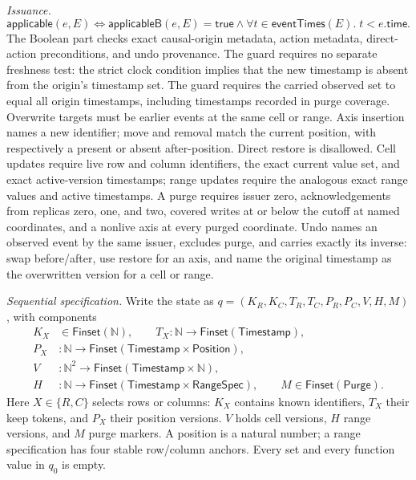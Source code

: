 \documentclass[11pt]{article}
\theoremstyle{definition}
\newcommand{\N}{\mathbb N}
\newcommand{\Time}{\mathsf{Timestamp}}
\begin{document}
\emph{Issuance.}
\[
 \mathsf{applicable}(e,E)\Longleftrightarrow
 \mathsf{applicableB}(e,E)=\mathsf{true}
 \land\forall t\in\mathsf{eventTimes}(E).\;t<e.\mathsf{time}.
\]
The Boolean part checks exact causal-origin metadata, action
metadata, direct-action preconditions, and undo provenance. The guard requires
no separate freshness test: the strict clock condition implies that the new
timestamp is absent from the origin's timestamp set. The guard requires
the carried observed set to equal all origin timestamps, including timestamps
recorded in purge coverage. Overwrite targets must be earlier events at the
same cell or range. Axis insertion names a new identifier; move and removal
match the current position, with respectively a present or absent after-position.
Direct restore is disallowed. Cell updates require live row and column
identifiers, the exact current value set, and exact active-version timestamps;
range updates require the analogous exact range values and active timestamps.
A purge requires issuer zero, acknowledgements from replicas zero, one, and
two, covered writes at or below the cutoff at named coordinates, and a nonlive
axis at every purged coordinate. Undo names an observed event by the same
issuer, excludes purge, and carries exactly its inverse: swap before/after,
use restore for an axis, and name the original timestamp as the overwritten
version for a cell or range.

\emph{Sequential specification.} Write the state as
$q=(K_R,K_C,T_R,T_C,P_R,P_C,V,H,M)$, with components
\[
\begin{aligned}
 K_X&\in\mathsf{Finset}(\N),\qquad
 T_X:\N\to\mathsf{Finset}(\Time),\\
 P_X&:\N\to\mathsf{Finset}(\Time\times\mathsf{Position}),\\
 V&:\N^2\to\mathsf{Finset}(\Time\times\N),\\
 H&:\N\to\mathsf{Finset}(\Time\times\mathsf{RangeSpec}),\qquad
 M\in\mathsf{Finset}(\mathsf{Purge}).
\end{aligned}
\]
Here $X\in\{R,C\}$ selects rows or columns: $K_X$ contains known identifiers,
$T_X$ their keep tokens, and $P_X$ their position versions. $V$ holds cell
versions, $H$ range versions, and $M$ purge markers. A position is a natural
number; a range specification has four stable row/column anchors.
Every set and every function value in $q_0$ is empty.
\end{document}
